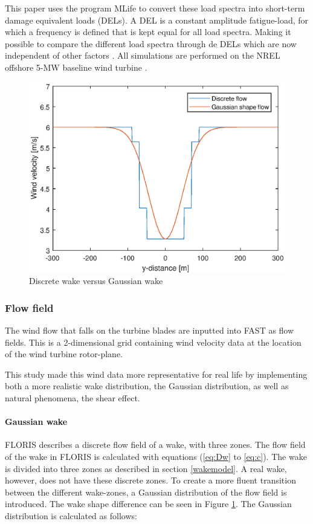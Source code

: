 This paper uses the program MLife to convert these load spectra into short-term damage equivalent loads (DELs). A DEL is a constant amplitude fatigue-load, for which a frequency is defined that is kept equal for all load spectra. Making it possible to compare the different load spectra through de DELs which are now independent of other factors \cite{MLife} \cite{Wilson2017}. All simulations are performed on the NREL offshore 5-MW baseline wind turbine \cite{Jonkman2005}.


\begin{figure}
  \includegraphics[width=\linewidth]{./Figures/PlotGausDiscWakeDWake180U6yaw0.eps} %
  \caption{Discrete wake versus Gaussian wake} %
  \label{fig:disgaus}
\end{figure}


\subsubsection{Flow field} \label{sec:flowfield}
The wind flow that falls on the turbine blades are inputted into FAST as flow fields. This is a 2-dimensional grid containing wind velocity data at the location of the wind turbine rotor-plane.

This study made this wind data more representative for real life by implementing both a more realistic wake distribution, the Gaussian distribution, as well as natural phenomena, the shear effect.

\paragraph{Gaussian wake}
FLORIS describes a discrete flow field of a wake, with three zones. The flow field of the wake in FLORIS is calculated with equations (\ref{eq:Dw} to \ref{eq:c}). The wake is divided into three zones as described in section \ref{wakemodel}. A real wake, however, does not have these discrete zones. To create a more fluent transition between the different wake-zones, a Gaussian distribution of the flow field is introduced\cite{Bastankhah2016}. The wake shape difference can be seen in Figure \ref{fig:disgaus}.  The Gaussian distribution is calculated as follows: 

